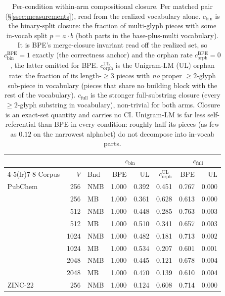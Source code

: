 \begin{table}[htbp]
  \centering
  \caption{Per-condition within-arm compositional closure. Per matched pair (\S\ref{ssec:measurements}), read from the realized vocabulary alone. $c_{\mathrm{bin}}$ is the binary-split closure: the fraction of multi-glyph pieces with some in-vocab split $p{=}a{\cdot}b$ (both parts in the base-plus-multi vocabulary). It is BPE's merge-closure invariant read off the realized set, so $c_{\mathrm{bin}}^{\mathrm{BPE}}{=}1$ exactly (the correctness anchor) and the orphan rate $c_{\mathrm{orph}}^{\mathrm{BPE}}{=}0$, the latter omitted for BPE. $c_{\mathrm{orph}}^{\mathrm{UL}}$ is the Unigram-LM (UL) orphan rate: the fraction of its length-$\ge 3$ pieces with \emph{no} proper $\ge 2$-glyph sub-piece in vocabulary (pieces that share no building block with the rest of the vocabulary). $c_{\mathrm{full}}$ is the stronger full-substring closure (every $\ge 2$-glyph substring in vocabulary), non-trivial for both arms. Closure is an exact-set quantity and carries no CI. Unigram-LM is far less self-referential than BPE in every condition: roughly half its pieces (as few as $0.12$ on the narrowest alphabet) do not decompose into in-vocab parts.}
  \label{tab:results-closure}
  \footnotesize
  \begin{tabular}{@{}l r l r r r r r@{}}
    \toprule
    & & & \multicolumn{2}{c}{$c_{\mathrm{bin}}$} & & \multicolumn{2}{c}{$c_{\mathrm{full}}$} \\
    \cmidrule(lr){4-5}\cmidrule(lr){7-8}
    Corpus & $V$ & Bnd & BPE & UL & $c_{\mathrm{orph}}^{\mathrm{UL}}$ & BPE & UL \\
    \midrule
    PubChem & 256 & NMB & 1.000 & 0.392 & 0.451 & 0.767 & 0.000 \\
     & 256 & MB & 1.000 & 0.361 & 0.628 & 0.613 & 0.000 \\
     & 512 & NMB & 1.000 & 0.448 & 0.285 & 0.763 & 0.003 \\
     & 512 & MB & 1.000 & 0.510 & 0.341 & 0.657 & 0.003 \\
     & 1024 & NMB & 1.000 & 0.482 & 0.181 & 0.713 & 0.002 \\
     & 1024 & MB & 1.000 & 0.534 & 0.207 & 0.601 & 0.001 \\
     & 2048 & NMB & 1.000 & 0.445 & 0.121 & 0.678 & 0.004 \\
     & 2048 & MB & 1.000 & 0.470 & 0.139 & 0.610 & 0.004 \\
    \addlinespace
    ZINC-22 & 256 & NMB & 1.000 & 0.124 & 0.608 & 0.714 & 0.000 \\

\end{tabular}
\end{table}
